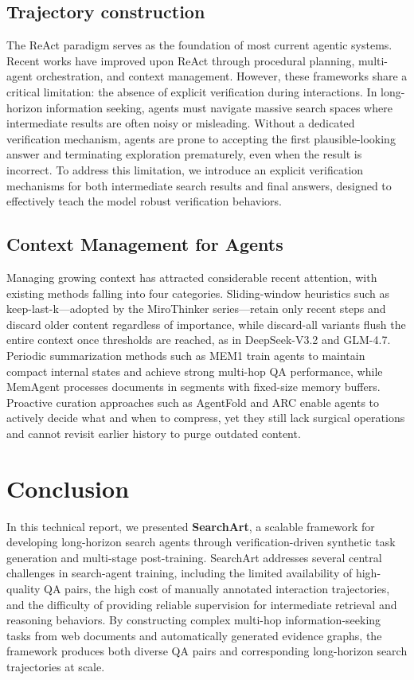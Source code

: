 \documentclass{huawei}
\begin{document}
\subsection{Trajectory construction}
The ReAct paradigm serves as the foundation of most current agentic systems. Recent works have improved upon ReAct through procedural planning, multi-agent orchestration, and context management. However, these frameworks share a critical limitation: the absence of explicit verification during interactions. In long-horizon information seeking, agents must navigate massive search spaces where intermediate results are often noisy or misleading. Without a dedicated verification mechanism, agents are prone to accepting the first plausible-looking answer and terminating exploration prematurely, even when the result is incorrect. To address this limitation, we introduce an explicit verification mechanisms for both intermediate search results and final answers, designed to effectively teach the model robust verification behaviors.



\subsection{Context Management for Agents}
Managing growing context has attracted considerable recent attention, with existing methods falling into four categories. Sliding-window heuristics such as keep-last-k—adopted by the MiroThinker series—retain only recent steps and discard older content regardless of importance, while discard-all variants flush the entire context once thresholds are reached, as in DeepSeek-V3.2 and GLM-4.7. Periodic summarization methods such as MEM1 train agents to maintain compact internal states and achieve strong multi-hop QA performance, while MemAgent processes documents in segments with fixed-size memory buffers. Proactive curation approaches such as AgentFold and ARC enable agents to actively decide what and when to compress, yet they still lack surgical operations and cannot revisit earlier history to purge outdated content.

\fi



\section{Conclusion}
In this technical report, we presented \textbf{SearchArt}, a scalable framework for developing long-horizon search agents through verification-driven synthetic task generation and multi-stage post-training. SearchArt addresses several central challenges in search-agent training, including the limited availability of high-quality QA pairs, the high cost of manually annotated interaction trajectories, and the difficulty of providing reliable supervision for intermediate retrieval and reasoning behaviors. By constructing complex multi-hop information-seeking tasks from web documents and automatically generated evidence graphs, the framework produces both diverse QA pairs and corresponding long-horizon search trajectories at scale.
\end{document}
